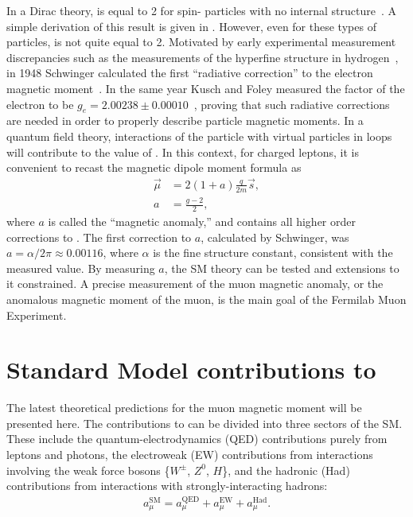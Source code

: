 In a Dirac theory, \g is equal to 2 for spin-\textonehalf\xspace particles with no internal structure~\cite{Dirac}. A simple derivation of this result is given in . However, even for these types of particles, \g is not quite equal to 2. Motivated by early experimental measurement discrepancies such as the measurements of the hyperfine structure in hydrogen~\cite{EarlyHyperfine1}, in 1948 Schwinger calculated the first ``radiative correction'' to the electron magnetic moment~\cite{Schwinger}. In the same year Kusch and Foley measured the \g factor of the electron to be $g_{e} = 2.00238 \pm 0.00010$~\cite{KuschFoley1,KuschFoley2}, proving that such radiative corrections are needed in order to properly describe particle magnetic moments. In a quantum field theory, interactions of the particle with virtual particles in loops will contribute to the value of \g. In this context, for charged leptons, it is convenient to recast the magnetic dipole moment formula as 
		\begin{equation}
		\begin{aligned}
            \vec{\mu} &= 2(1+a) \frac{q}{2m} \vec{s}, \\
            a &= \frac{g-2}{2},
        \label{eq:anamoly}
		\end{aligned}
		\end{equation}
where $a$ is called the ``magnetic anomaly,'' and contains all higher order corrections to \g. The first correction to $a$, calculated by Schwinger, was $a = \alpha/2\pi \approx 0.00116$, where $\alpha$ is the fine structure constant, consistent with the measured value. By measuring $a$, the SM theory can be tested and extensions to it constrained. A precise measurement of the muon magnetic anomaly, or the anomalous magnetic moment of the muon, is the main goal of the Fermilab Muon \gmtwo Experiment.


\section{Standard Model contributions to \amu}
\label{sec:Theory}

The latest theoretical predictions for the muon magnetic moment will be presented here. The contributions to \amu can be divided into three sectors of the SM. These include the quantum-electrodynamics (QED) contributions purely from leptons and photons, the electroweak (EW) contributions from interactions involving the weak force bosons \{$W^{\pm}$, $Z^{0}$, $H$\}, and the hadronic (Had) contributions from interactions with strongly-interacting hadrons:
		\begin{align}
            a_{\mu}^{\text{SM}} = a_{\mu}^{\text{QED}} + a_{\mu}^{\text{EW}} + a_{\mu}^{\text{Had}}.
		\end{align}


